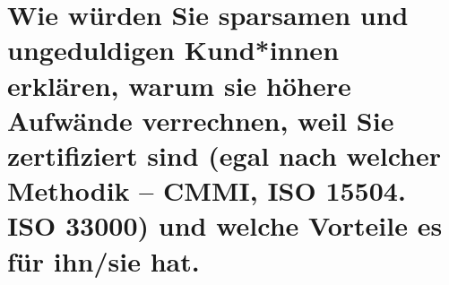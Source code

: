 \section{Wie würden Sie sparsamen und ungeduldigen Kund*innen erklären,  warum sie höhere Aufwände verrechnen, weil  Sie zertifiziert sind (egal nach welcher Methodik – CMMI, ISO 15504. ISO 33000) und welche Vorteile es für ihn/sie hat.}